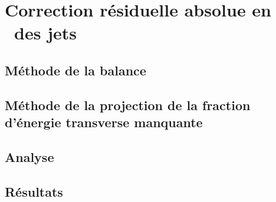 \section{Correction résiduelle absolue en \pT\ des jets}\label{chapter-JERC-section-JES}

\subsection{Méthode de la balance}\label{chapter-JERC-section-JES-subsec-balance}

\subsection{Méthode de la projection de la fraction d'énergie transverse manquante}\label{chapter-JERC-section-JES-subsec-MPF}

\subsection{Analyse}\label{chapter-JERC-section-JES-subsec-analyse}

\subsection{Résultats}\label{chapter-JERC-section-JES-subsec-results}
